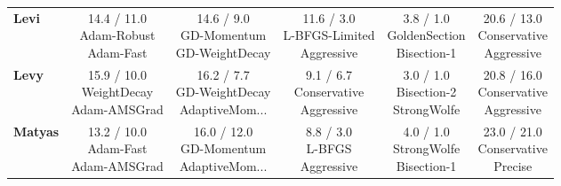 \documentclass{article}
\begin{document}
\begin{longtable}{lccccc}
\textbf{Levi} &  \makecell{14.4 / 11.0 \\ \scriptsize{Adam-Robust} \\ \scriptsize{Adam-Fast}}&  \makecell{14.6 / 9.0 \\ \scriptsize{GD-Momentum} \\ \scriptsize{GD-WeightDecay}}&  \makecell{11.6 / 3.0 \\ \scriptsize{L-BFGS-Limited} \\ \scriptsize{Aggressive}}& \cellcolor{bestgreen!30} \makecell{3.8 / 1.0 \\ \scriptsize{GoldenSection} \\ \scriptsize{Bisection-1}}& \cellcolor{worstred!20} \makecell{20.6 / 13.0 \\ \scriptsize{Conservative} \\ \scriptsize{Aggressive}} \\
\textbf{Levy} &  \makecell{15.9 / 10.0 \\ \scriptsize{WeightDecay} \\ \scriptsize{Adam-AMSGrad}}&  \makecell{16.2 / 7.7 \\ \scriptsize{GD-WeightDecay} \\ \scriptsize{AdaptiveMom...}}&  \makecell{9.1 / 6.7 \\ \scriptsize{Conservative} \\ \scriptsize{Aggressive}}& \cellcolor{bestgreen!30} \makecell{3.0 / 1.0 \\ \scriptsize{Bisection-2} \\ \scriptsize{StrongWolfe}}& \cellcolor{worstred!20} \makecell{20.8 / 16.0 \\ \scriptsize{Conservative} \\ \scriptsize{Aggressive}} \\
\textbf{Matyas} &  \makecell{13.2 / 10.0 \\ \scriptsize{Adam-Fast} \\ \scriptsize{Adam-AMSGrad}}&  \makecell{16.0 / 12.0 \\ \scriptsize{GD-Momentum} \\ \scriptsize{AdaptiveMom...}}&  \makecell{8.8 / 3.0 \\ \scriptsize{L-BFGS} \\ \scriptsize{Aggressive}}& \cellcolor{bestgreen!30} \makecell{4.0 / 1.0 \\ \scriptsize{StrongWolfe} \\ \scriptsize{Bisection-1}}& \cellcolor{worstred!20} \makecell{23.0 / 21.0 \\ \scriptsize{Conservative} \\ \scriptsize{Precise}} \\

\end{longtable}
\end{document}
